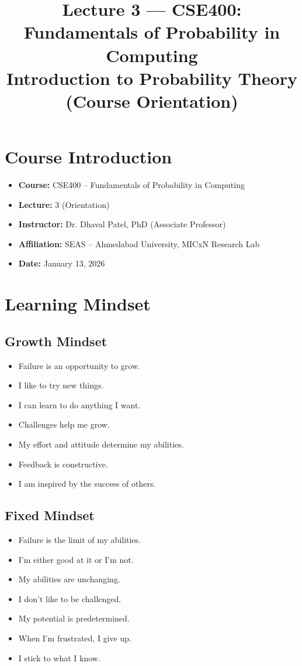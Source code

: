 \documentclass[11pt]{article}
\title{\textbf{Lecture 3 --- CSE400: Fundamentals of Probability in Computing}\\
\vspace{0.3em}
\large Introduction to Probability Theory (Course Orientation)}
\author{}
\date{}
\begin{document}
\maketitle

\section{Course Introduction}

\begin{itemize}[leftmargin=1.5em]
    \item \textbf{Course:} CSE400 -- Fundamentals of Probability in Computing
    \item \textbf{Lecture:} 3 (Orientation)
    \item \textbf{Instructor:} Dr. Dhaval Patel, PhD (Associate Professor)
    \item \textbf{Affiliation:} SEAS -- Ahmedabad University, MICxN Research Lab
    \item \textbf{Date:} January 13, 2026
\end{itemize}

\section{Learning Mindset}

\subsection*{Growth Mindset}
\begin{itemize}
    \item Failure is an opportunity to grow.
    \item I like to try new things.
    \item I can learn to do anything I want.
    \item Challenges help me grow.
    \item My effort and attitude determine my abilities.
    \item Feedback is constructive.
    \item I am inspired by the success of others.
\end{itemize}

\subsection*{Fixed Mindset}
\begin{itemize}
    \item Failure is the limit of my abilities.
    \item I’m either good at it or I’m not.
    \item My abilities are unchanging.
    \item I don’t like to be challenged.
    \item My potential is predetermined.
    \item When I’m frustrated, I give up.
    \item I stick to what I know.
\end{itemize}
\end{document}
